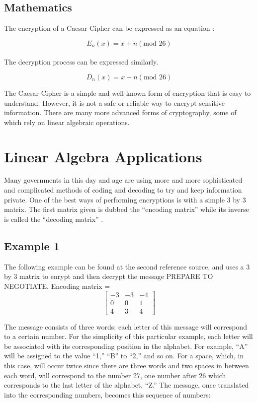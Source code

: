 \documentclass{article}
\begin{document}
\subsection{Mathematics}
The encryption of a Caesar Cipher can be expressed as an equation \cite{ref3:3}:

$$ E_{n}(x) = x + n  (\text{mod }26)$$\\
The decryption process can be expressed similarly.

$$ D_{n}(x) = x - n  (\text{mod }26)$$

\noindent
The Caesar Cipher is a simple and well-known form of encryption that is easy to understand. However, it is not a safe or reliable way to encrypt sensitive information. There are many more advanced forms of cryptography, some of which rely on linear algebraic operations.

\section{Linear Algebra Applications}
Many governments in this day and age are using more and more sophisticated and complicated methods of coding and decoding to try and keep information private. One of the best ways of performing encryptions is with a simple 3 by 3 matrix. The first matrix given is dubbed the “encoding matrix” while its inverse is called the “decoding matrix” \cite{ref4:4}.

\subsection{Example 1}
The following example can be found at the second reference source, and uses a 3 by 3 matrix to enrypt and then decrypt the message PREPARE TO NEGOTIATE.
{\center
Encoding matrix = 
$$
\begin{bmatrix}
-3 & -3 & -4 \\
0 & 0 & 1 \\
4 & 3 & 4 
\end{bmatrix}
$$
\endcenter}

\noindent
The message consists of three words; each letter of this message will correspond to a certain number. For the simplicity of this particular example, each letter will be associated with its corresponding position in the alphabet. For example, “A” will be assigned to the value “1,” “B” to “2,” and so on. For a space, which, in this case, will occur twice since there are three words and two spaces in between each word, will correspond to the number 27, one number after 26 which corresponds to the last letter of the alphabet, “Z.” The message, once translated into the corresponding numbers, becomes this sequence of numbers:
\end{document}
